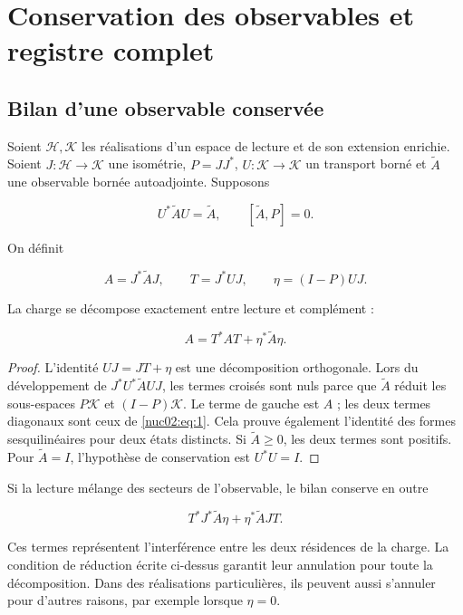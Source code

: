 \section{Conservation des observables et registre complet
}
\label{nuclear:2}
\subsection{Bilan d’une observable conservée
}

Soient \(\mathcal H,\mathcal K\) les réalisations d’un espace de lecture et de son extension enrichie. Soient \(J:\mathcal H\to\mathcal K\) une isométrie, \(P=JJ^*\), \(U:\mathcal K\to\mathcal K\) un transport borné et \(\widetilde A\) une observable bornée autoadjointe. Supposons


\[
U^*\widetilde A U=\widetilde A,\qquad [\widetilde A,P]=0.
\]

On définit

\[
A=J^*\widetilde A J,\qquad T=J^*UJ,
\qquad \eta=(I-P)UJ.
\]

\begin{proposition}
\label{nuc02:balance}
La charge se décompose exactement entre lecture et complément :

\begin{equation}
\boxed{A=T^*AT+\eta^*\widetilde A\eta.}\label{nuc02:eq:1}
\end{equation}
\end{proposition}

\begin{proof}
L’identité \(UJ=JT+\eta\) est une décomposition orthogonale. Lors du développement de \(J^*U^*\widetilde A UJ\), les termes croisés sont nuls parce que \(\widetilde A\) réduit les sous-espaces \(P\mathcal K\) et \((I-P)\mathcal K\). Le terme de gauche est \(A\) ; les deux termes diagonaux sont ceux de \eqref{nuc02:eq:1}. Cela prouve également l’identité des formes sesquilinéaires pour deux états distincts. Si \(\widetilde A\geq0\), les deux termes sont positifs. Pour \(\widetilde A=I\), l’hypothèse de conservation est \(U^*U=I\).
\end{proof}

Si la lecture mélange des secteurs de l’observable, le bilan conserve en outre


\[
T^*J^*\widetilde A\eta+\eta^*\widetilde A JT.
\]

Ces termes représentent l’interférence entre les deux résidences de la charge. La condition de réduction écrite ci-dessus garantit leur annulation pour toute la décomposition. Dans des réalisations particulières, ils peuvent aussi s’annuler pour d’autres raisons, par exemple lorsque \(\eta=0\).


